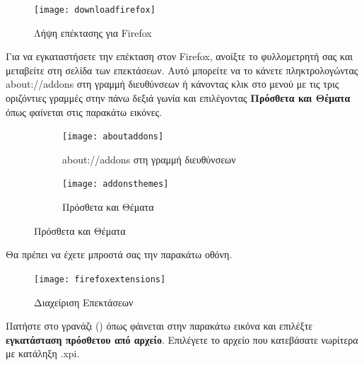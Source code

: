 \documentclass{article}
\begin{document}
\begin{figure}[H]
    \centering
    \texttt{[image: downloadfirefox]}
    \caption*{Λήψη επέκτασης για Firefox}
\end{figure}

Για να εγκαταστήσετε την επέκταση στον Firefox, ανοίξτε το φυλλομετρητή σας και μεταβείτε στη σελίδα των επεκτάσεων. Αυτό μπορείτε να το κάνετε πληκτρολογώντας about://addons στη γραμμή διευθύνσεων ή κάνοντας κλικ στο μενού με τις τρις οριζόντιες γραμμές στην πάνω δεξιά γωνία και επιλέγοντας \textbf{Πρόσθετα και Θέματα} όπως φαίνεται στις παρακάτω εικόνες. 

\begin{figure}[H]
    \centering
    \begin{minipage}[t]{0.45\textwidth}
        \centering
        \begin{subfigure}[t]{\textwidth}
            \texttt{[image: aboutaddons]}
        \caption{about://addons στη γραμμή διευθύνσεων}
        \label{Fig:aboutaddons}
        \end{subfigure}
        \vspace{\fill}
    \end{minipage}
    \hfill
    \begin{minipage}{0.45\textwidth}
        \begin{subfigure}{\textwidth}
            \texttt{[image: addonsthemes]}
            \caption{Πρόσθετα και Θέματα}
            \label{Fig:addonsthemes}
        \end{subfigure}
    \end{minipage}
\end{figure}

Θα πρέπει να έχετε μπροστά σας την παρακάτω οθόνη.

\begin{figure}[H]
    \texttt{[image: firefoxextensions]}
    \caption*{Διαχείριση Επεκτάσεων}
\end{figure}

Πατήστε στο γρανάζι (\faCog) όπως φάινεται στην παρακάτω εικόνα και επιλέξτε \textbf{εγκατάσταση πρόσθετου από αρχείο}. Επιλέγετε το αρχείο που κατεβάσατε νωρίτερα με κατάληξη .xpi.
\end{document}
